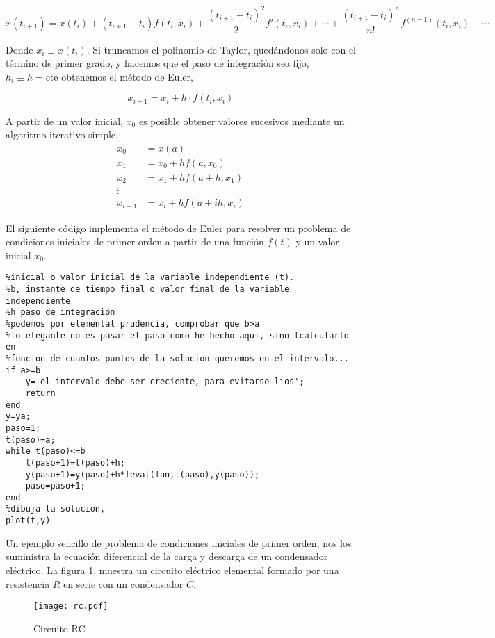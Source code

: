 \begin{equation*}
x(t_{i+1})=x(t_i)+(t_{i+1}-t_{i})f(t_i,x_i)+\frac{(t_{i+1}-t_{i})^2}{2}f'(t_i,x_i)+\cdots+ \frac{(t_{i+1}-t_i)^n}{n!}f^{(n-1)}(t_i,x_i)+\cdots
\end{equation*}

Donde $x_i\equiv x(t_i)$. Si truncamos el polinomio de Taylor, quedándonos solo con el término de primer grado, y hacemos que el paso de integración sea fijo, $h_i\equiv h=\mathrm{cte}$ obtenemos el método de Euler,

\begin{equation*}
x_{i+1}=x_i+h\cdot f(t_i,x_i)
\end{equation*}

A partir de un valor inicial, $x_0$ es posible obtener valores sucesivos mediante un algoritmo iterativo simple,
\begin{align*}
x_0&=x(a)\\
x_1&=x_0+hf(a,x_0)\\
x_2&=x_1+hf(a+h,x_1)\\
\vdots \\
x_{i+1}&=x_i+hf(a+ih,x_i)
\end{align*}

El siguiente código implementa el método de Euler para resolver un problema de condiciones iniciales de primer orden a partir de una función $f(t)$ y un valor inicial $x_0$.

\begin{verbatim}
%inicial o valor inicial de la variable independiente (t). 
%b, instante de tiempo final o valor final de la variable independiente
%h paso de integración
%podemos por elemental prudencia, comprobar que b>a
%lo elegante no es pasar el paso como he hecho aqui, sino tcalcularlo en
%funcion de cuantos puntos de la solucion queremos en el intervalo...
if a>=b
    y='el intervalo debe ser creciente, para evitarse lios';
    return
end
y=ya;
paso=1;
t(paso)=a;
while t(paso)<=b
    t(paso+1)=t(paso)+h;
    y(paso+1)=y(paso)+h*feval(fun,t(paso),y(paso));
    paso=paso+1;
end
%dibuja la solucion,
plot(t,y)
\end{verbatim}

Un ejemplo sencillo de problema de condiciones iniciales de primer orden, nos los suministra la ecuación diferencial de la carga y descarga de un condensador eléctrico. La figura \ref{fig:RC}, muestra un circuito eléctrico elemental formado por una resistencia $R$ en serie con un condensador $C$. 

\begin{figure}[h]
\centering
\texttt{[image: rc.pdf]}
\caption{Circuito RC}
\label{fig:RC}
\end{figure}

